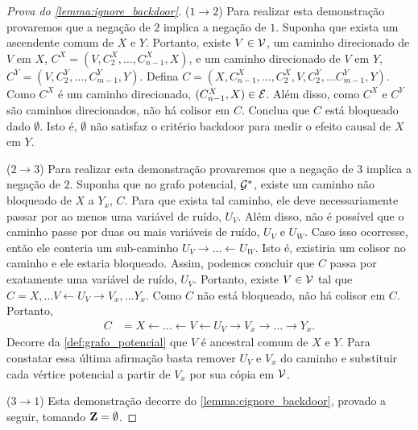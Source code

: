 \begin{proof}[Prova do \cref{lemma:ignore_backdoor}]
 ($1 \rightarrow 2$)
 Para realizar esta demonstração provaremos que
 a negação de $2$ implica a negação de $1$.
 Suponha que exista um ascendente comum de $X$ e $Y$.
 Portanto, existe $V \in {\mathcal V}$,
 um caminho direcionado de $V$ em $X$, 
 $C^X = (V, C^X_2, \ldots, C^X_{n-1},X)$, e
 um caminho direcionado de $V$ em $Y$,
 $C^Y = (V, C^Y_2, \ldots, C^Y_{m-1},Y)$.
 Defina
 $C = (X, C^X_{n-1}, \ldots, C^X_2, V, C^Y_2, \ldots C^Y_{m-1}, Y)$.
 Como $C^X$ é um caminho direcionado, $(C^X_{n-1}, X) \in {\mathcal E}$.
 Além disso, como $C^X$ e $C^Y$ são caminhos direcionados,
 não há colisor em $C$.
 Conclua que $C$ está bloqueado dado $\emptyset$.
 Isto é, $\emptyset$ não satisfaz o critério backdoor
 para medir o efeito causal de $X$ em $Y$.
 
 ($2 \rightarrow 3$)
 Para realizar esta demonstração provaremos que
 a negação de $3$ implica a negação de $2$.
 Suponha que no grafo potencial, ${\mathcal G}^*$,
 existe um caminho não bloqueado de $X$ a $Y_x$, $C$.
 Para que exista tal caminho, 
 ele deve necessariamente passar por ao menos uma variável de ruído, $U_V$.
 Além disso, não é possível que o caminho passe por duas ou mais variáveis de ruído,
 $U_V$ e $U_W$. Caso isso ocorresse, então ele conteria um sub-caminho
 $U_V \rightarrow \ldots \leftarrow U_W$.
 Isto é, existiria um colisor no caminho e ele estaria bloqueado.
 Assim, podemos concluir que $C$ passa por exatamente uma variável de ruído, $U_V$.
 Portanto, existe $V \in {\mathcal V}$ tal que
 $C = X, \ldots V \leftarrow U_V \rightarrow V_x, \ldots Y_x$.
 Como $C$ não está bloqueado, não há colisor em $C$.
 Portanto,
 \begin{align*}
  C &= X \leftarrow \ldots \leftarrow V \leftarrow U_V 
  \rightarrow V_x \rightarrow \ldots \rightarrow Y_x.
 \end{align*}
 Decorre da \cref{def:grafo_potencial} que
 $V$ é ancestral comum de $X$ e $Y$.
 Para constatar essa última afirmação basta
 remover $U_V$ e $V_x$ do caminho e
 substituir cada vértice potencial 
 a partir de $V_x$ por sua cópia em ${\mathcal V}$.
 
 ($3 \rightarrow 1$)
 Esta demonstração decorre do \cref{lemma:cignore_backdoor},
 provado a seguir, tomando ${\mathbf{Z}} = \emptyset$.
\end{proof}

